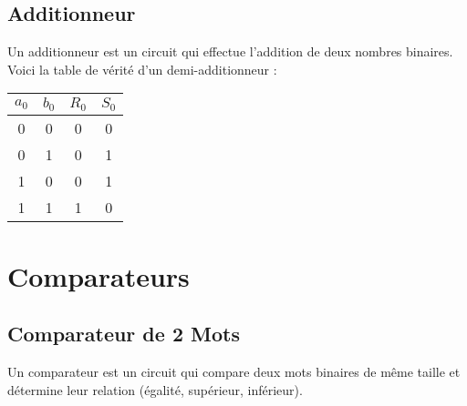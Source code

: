 \documentclass[10pt,a4paper]{article}
\begin{document}

\subsection*{Additionneur}

Un additionneur est un circuit qui effectue l'addition de deux nombres binaires. Voici la table de vérité d'un demi-additionneur :

\begin{center}
    \begin{tabular}{|c|c|c|c|}
    \hline
    \( a_0 \) & \( b_0 \) & \( R_0 \) & \( S_0 \) \\
    \hline
    0 & 0 & 0 & 0 \\
    0 & 1 & 0 & 1 \\
    1 & 0 & 0 & 1 \\
    1 & 1 & 1 & 0 \\
    \hline
    \end{tabular}
\end{center}


\section*{Comparateurs}

\subsection*{Comparateur de 2 Mots}

Un comparateur est un circuit qui compare deux mots binaires de même taille et détermine leur relation (égalité, supérieur, inférieur).
\end{document}
